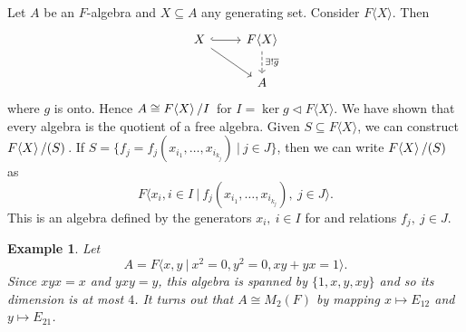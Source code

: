 \documentclass[10pt, a4paper]{article}
\newtheorem{example}[thm]{Example}
\newcommand{\quot}[2]{{\raisebox{0em}{$#1$}\left/\raisebox{0em}{$#2$}\right.}}
\begin{document}
Let $A$ be an $F$-algebra and $X \subseteq A$ any generating set.
Consider $F\langle X \rangle$. Then
\[\begin{tikzcd}
	X & {F \langle X\rangle} \\
	& A
	\arrow[from=1-1, to=2-2]
	\arrow[hook, from=1-1, to=1-2]
	\arrow["{\exists!\overline{g}}", dashed, from=1-2, to=2-2]
\end{tikzcd}\]
where $g$ is onto. Hence $A \cong \quot{F \langle X \rangle}{I}$ for $I = \ker g \lhd F \langle X \rangle$.
We have shown that every algebra is the quotient of a free algebra.
Given $S \subseteq F \langle X \rangle$, we can construct $\quot{F\langle X \rangle}{(S)}$.
If $S = \{f_j = f_j (x_{i_1}, \dots, x_{i_{k_j}})\ |\ j \in J\}$, then we can write $\quot{F \langle X \rangle}{(S)}$ as
$$F \langle x_i, i \in I\ |\ f_j (x_{i_1}, \dots, x_{i_{k_j}}),\ j \in J \rangle.$$
This is an algebra defined by the generators $x_i,\ i \in I$ for and relations $f_j,\ j \in J$. 

\begin{example}
  Let $$A = F \langle x, y\ |\ x^2 = 0, y^2 = 0, xy + yx = 1 \rangle.$$
  Since $xyx = x$ and $yxy = y$, this algebra is spanned by $\{1, x, y, xy\}$
  and so its dimension is at most $4$. It turns out that $A \cong M_2 (F)$ by mapping $x \mapsto E_{12}$
  and $y \mapsto E_{21}$.
\end{example}
\end{document}
